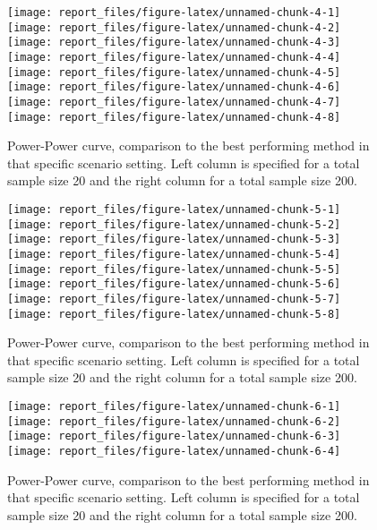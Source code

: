 \documentclass[
]{article}
\begin{document}
\begin{figure}[H]
\texttt{[image: report\_files/figure-latex/unnamed-chunk-4-1]} \texttt{[image: report\_files/figure-latex/unnamed-chunk-4-2]} \texttt{[image: report\_files/figure-latex/unnamed-chunk-4-3]} \texttt{[image: report\_files/figure-latex/unnamed-chunk-4-4]} \texttt{[image: report\_files/figure-latex/unnamed-chunk-4-5]} \texttt{[image: report\_files/figure-latex/unnamed-chunk-4-6]} \texttt{[image: report\_files/figure-latex/unnamed-chunk-4-7]} \texttt{[image: report\_files/figure-latex/unnamed-chunk-4-8]} \caption{Power-Power curve, comparison to the best performing method in that specific scenario setting. Left column is specified for a total sample size 20 and the right column for a total sample size 200.  }\label{fig:unnamed-chunk-4}
\end{figure}

\begin{figure}[H]
\texttt{[image: report\_files/figure-latex/unnamed-chunk-5-1]} \texttt{[image: report\_files/figure-latex/unnamed-chunk-5-2]} \texttt{[image: report\_files/figure-latex/unnamed-chunk-5-3]} \texttt{[image: report\_files/figure-latex/unnamed-chunk-5-4]} \texttt{[image: report\_files/figure-latex/unnamed-chunk-5-5]} \texttt{[image: report\_files/figure-latex/unnamed-chunk-5-6]} \texttt{[image: report\_files/figure-latex/unnamed-chunk-5-7]} \texttt{[image: report\_files/figure-latex/unnamed-chunk-5-8]} \caption{Power-Power curve, comparison to the best performing method in that specific scenario setting. Left column is specified for a total sample size 20 and the right column for a total sample size 200.  }\label{fig:unnamed-chunk-5}
\end{figure}

\begin{figure}[H]
\texttt{[image: report\_files/figure-latex/unnamed-chunk-6-1]} \texttt{[image: report\_files/figure-latex/unnamed-chunk-6-2]} \texttt{[image: report\_files/figure-latex/unnamed-chunk-6-3]} \texttt{[image: report\_files/figure-latex/unnamed-chunk-6-4]} \caption{Power-Power curve, comparison to the best performing method in that specific scenario setting. Left column is specified for a total sample size 20 and the right column for a total sample size 200.  }\label{fig:unnamed-chunk-6}
\end{figure}
\end{document}
